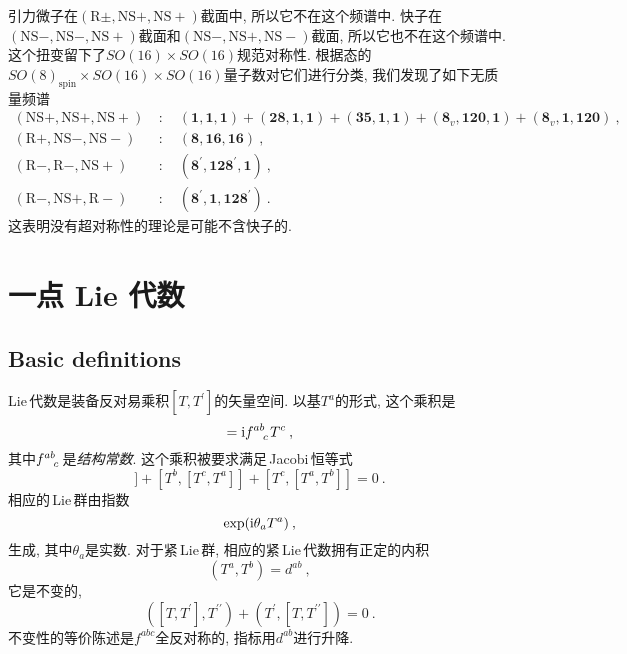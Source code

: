 引力微子在$ (\mathrm{R}\pm,\mathrm{NS}+,\mathrm{NS}+) $截面中, 所以它不在这个频谱中. 快子在$ (\mathrm{NS}-,\mathrm{NS}-,\mathrm{NS}+) $截面和$ (\mathrm{NS}-,\mathrm{NS}+,\mathrm{NS}-) $截面, 所以它也不在这个频谱中. 这个扭变留下了$ SO(16)\times SO(16) $规范对称性. 根据态的$ SO(8)_{\text{spin}}\times SO(16)\times SO(16) $量子数对它们进行分类, 我们发现了如下无质量频谱
\begin{align*}
    (\mathrm{NS}+,\mathrm{NS}+,\mathrm{NS}+)&\::\quad (\mathbf{1},\mathbf{1},\mathbf{1}) 
    + (\mathbf{28},\mathbf{1},\mathbf{1}) + (\mathbf{35},\mathbf{1},\mathbf{1})
    + (\mathbf{8}_{v},\mathbf{120},\mathbf{1}) + (\mathbf{8}_{v},\mathbf{1},\mathbf{120}) \:, \\
    (\mathrm{R}+,\mathrm{NS}-,\mathrm{NS}-)&\::\quad (\mathbf{8},\mathbf{16},\mathbf{16})\: , \\
    (\mathrm{R}-,\mathrm{R}-,\mathrm{NS}+)&\::\quad  (\mathbf{8}^{\prime},\mathbf{128}^{\prime},\mathbf{1})\:, \\
    (\mathrm{R}-,\mathrm{NS}+,\mathrm{R}-)&\::\quad (\mathbf{8}^{\prime},\mathbf{1},\mathbf{128}^{\prime})\:.
\end{align*}
这表明没有超对称性的理论是可能不含快子的.


\section{一点 Lie 代数}

\subsection*{Basic definitions}

Lie\,代数是装备反对易乘积$ [T,T^{\prime}] $的矢量空间. 以基$ T^{a} $的形式, 这个乘积是
\begin{equation}
    [T^{a},T^{b}] = \mi f\indices{^a^b_c}T^{c} \:, \label{11.4.1}
\end{equation}
其中$ f\indices{^a^b_c} $是{\emph{结构常数}}. 这个乘积被要求满足\,Jacobi\,恒等式
\begin{equation}
    [T^{a},[T^{b},T^{c}]] + [T^{b},[T^{c},T^{a}]] + [T^{c},[T^{a},T^{b}]] =0 \:.\label{11.4.2}
\end{equation}
相应的\,Lie\,群由指数
\begin{equation}
    \exp(\mathrm{i}\theta_{a}T^{a}) \:, \label{11.4.3}
\end{equation}
生成, 其中$ \theta_{a} $是实数. 对于紧\,Lie\,群, 相应的紧\,Lie\,代数拥有正定的内积
\begin{equation}
    (T^{a},T^{b}) = d^{ab} \:, \label{11.4.4}
\end{equation}
它是不变的,
\begin{equation}
    ([T,T^{\prime}],T^{\prime\prime}) + (T^{\prime},[T,T^{\prime\prime}]) =0\:. \label{11.4.5}
\end{equation}
不变性的等价陈述是$ f^{abc} $全反对称的, 指标用$ d^{ab} $进行升降.

